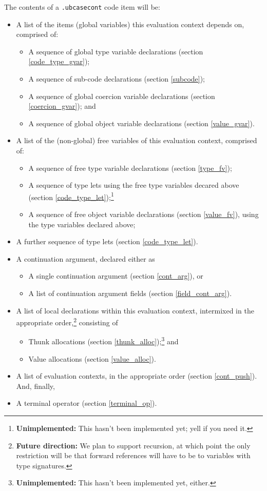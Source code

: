 \documentclass{report}
\newcommand\stringcode[1]{\texttt{#1}}
\newcommand\unimpl[1]{\footnote{\textbf{Unimplemented: }#1}}
\newcommand\future[1]{\footnote{\textbf{Future direction:} #1}}
\begin{document}
The contents of a \stringcode{.ubcasecont} code item will be:
\begin{itemize}
    \item A list of the items (global variables) this evaluation context depends on, comprised of:
        \begin{itemize}
            \item A sequence of global type variable declarations (section \ref{code_type_gvar});
            \item A sequence of sub-code declarations (section \ref{subcode});
            \item A sequence of global coercion variable declarations (section \ref{coercion_gvar}); and
            \item A sequence of global object variable declarations (section \ref{value_gvar}).
        \end{itemize}
    \item A list of the (non-global) free variables of this evaluation context, comprised of:
        \begin{itemize}
            \item A sequence of free type variable declarations (section \ref{type_fv});
            \item A sequence of type lets using the free type variables decared above (section \ref{code_type_let});\unimpl{This hasn't been implemented yet; yell if you need it.}
            \item A sequence of free object variable declarations (section \ref{value_fv}), using the type variables declared above;
        \end{itemize}
    \item A further sequence of type lets (section \ref{code_type_let}).
    \item A continuation argument, declared either as
        \begin{itemize}
            \item A single continuation argument (section \ref{cont_arg}), or
            \item A list of continuation argument fields (section \ref{field_cont_arg}).
        \end{itemize}
    \item A list of local declarations within this evaluation context,
        intermixed in the appropriate order,\future{We plan to support recursion, at which point the only restriction will be that forward references will have to be to variables with type signatures.}
        consisting of
        \begin{itemize}
            \item Thunk allocations (section \ref{thunk_alloc});\unimpl{This hasn't been implemented yet, either.} and
            \item Value allocations (section \ref{value_alloc}).
        \end{itemize}
    \item A list of evaluation contexts, in the appropriate order (section \ref{cont_push}).
        And, finally,
    \item A terminal operator (section \ref{terminal_op}).
\end{itemize}
\end{document}
